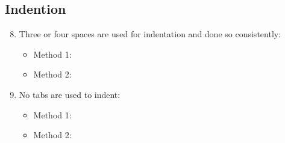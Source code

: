 \subsection{Indention}
\begin{enumerate}
	\setcounter{enumi}{7}
	\item Three or four spaces are used for indentation and done so consistently:
	\begin{itemize}
		\item Method 1: \cmark
		\item Method 2:
	\end{itemize}
	\item No tabs are used to indent:
	\begin{itemize}
		\item Method 1: \cmark
		\item Method 2: 
	\end{itemize}
\end{enumerate}